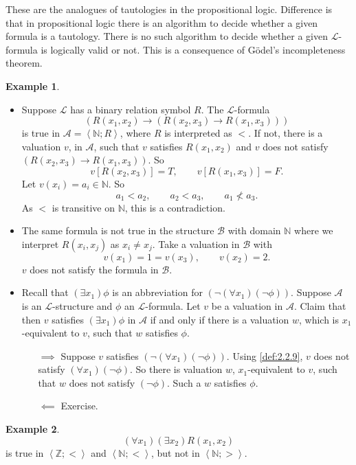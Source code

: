 \documentclass{article}
\newcommand{\N}{\mathbb{N}}
\newcommand{\Z}{\mathbb{Z}}
\newcommand{\A}{\mathcal{A}}
\newcommand{\B}{\mathcal{B}}
\renewcommand{\L}{\mathcal{L}}
\newcommand{\rb}[1]{\left( #1 \right)}
\renewcommand{\sb}[1]{\left[ #1 \right]}
\newcommand{\ab}[1]{\left\langle #1 \right\rangle}
\newcommand{\notb}[1]{\rb{\neg #1}}
\newcommand{\impb}[2]{\rb{#1 \rightarrow #2}}
\newcommand{\fab}[1]{\rb{\forall #1}}
\newcommand{\teb}[1]{\rb{\exists #1}}
\theoremstyle{definition}\newtheorem{definition}{Definition}[subsection]
\theoremstyle{definition}\newtheorem{remark1}[definition]{Remark}
\theoremstyle{definition}\newtheorem{example1}[definition]{Example}
\theoremstyle{definition}\newtheorem*{remark2}{Remark}
\theoremstyle{definition}\newtheorem*{example2}{Example}
\theoremstyle{definition}\newtheorem*{note}{Note}
\theoremstyle{definition}\newtheorem*{notation}{Notation}
\begin{document}
These are the analogues of tautologies in the propositional logic. Difference is that in propositional logic there is an algorithm to decide whether a given formula is a tautology. There is no such algorithm to decide whether a given $ \L $-formula is logically valid or not. This is a consequence of G\"odel's incompleteness theorem.

\begin{example1}
\hfill
\begin{itemize}
\item Suppose $ \L $ has a binary relation symbol $ R $. The $ \L $-formula
$$ \impb{R\rb{x_1, x_2}}{\impb{R\rb{x_2, x_3}}{R\rb{x_1, x_3}}} $$
is true in $ \A = \ab{\N; R} $, where $ R $ is interpreted as $ < $. If not, there is a valuation $ v $, in $ \A $, such that $ v $ satisfies $ R\rb{x_1, x_2} $ and $ v $ does not satisfy $ \impb{R\rb{x_2, x_3}}{R\rb{x_1, x_3}} $. So
$$ v\sb{R\rb{x_2, x_3}} = T, \qquad v\sb{R\rb{x_1, x_3}} = F. $$
Let $ v\rb{x_i} = a_i \in \N $. So
$$ a_1 < a_2, \qquad a_2 < a_3, \qquad a_1 \not< a_3. $$
As $ < $ is transitive on $ \N $, this is a contradiction.
\item The same formula is not true in the structure $ \B $ with domain $ \N $ where we interpret $ R\rb{x_i, x_j} $ as $ x_i \ne x_j $. Take a valuation in $ \B $ with
$$ v\rb{x_1} = 1 = v\rb{x_3}, \qquad v\rb{x_2} = 2. $$
$ v $ does not satisfy the formula in $ \B $.
\item Recall that $ \teb{x_1}\phi $ is an abbreviation for $ \notb{\fab{x_1}\notb{\phi}} $. Suppose $ \A $ is an $ \L $-structure and $ \phi $ an $ \L $-formula. Let $ v $ be a valuation in $ \A $. Claim that then $ v $ satisfies $ \teb{x_1}\phi $ in $ \A $ if and only if there is a valuation $ w $, which is $ x_1 $-equivalent to $ v $, such that $ w $ satisfies $ \phi $.
\begin{itemize}
\item[$ \implies $] Suppose $ v $ satisfies $ \notb{\fab{x_1}\notb{\phi}} $. Using \ref{def:2.2.9}, $ v $ does not satisfy $ \fab{x_1}\notb{\phi} $. So there is valuation $ w $, $ x_1 $-equivalent to $ v $, such that $ w $ does not satisfy $ \notb{\phi} $. Such a $ w $ satisfies $ \phi $.
\item[$ \impliedby $] Exercise.
\end{itemize}
\end{itemize}
\end{example1}

\begin{example1}
$$ \fab{x_1}\teb{x_2}R\rb{x_1, x_2} $$
is true in $ \ab{\Z; <} $ and $ \ab{\N; <} $, but not in $ \ab{\N; >} $.
\end{example1}
\end{document}
